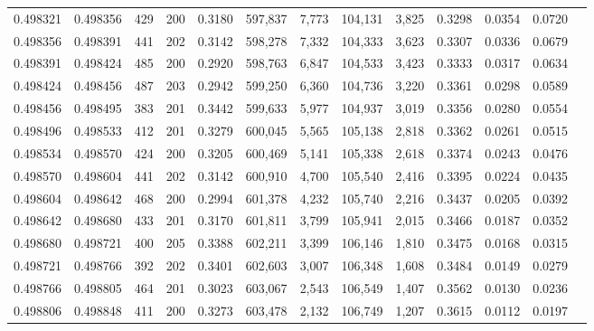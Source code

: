 \begin{tabular}{rrrrrrrrrrrrr}
0.498321 & 0.498356 &   429 & 200 &                                     0.3180 & 597,837 &   7,773 & 104,131 &   3,825 & 0.3298 & 0.0354 & 0.0720 \\
0.498356 & 0.498391 &   441 & 202 &                                     0.3142 & 598,278 &   7,332 & 104,333 &   3,623 & 0.3307 & 0.0336 & 0.0679 \\
0.498391 & 0.498424 &   485 & 200 &                                     0.2920 & 598,763 &   6,847 & 104,533 &   3,423 & 0.3333 & 0.0317 & 0.0634 \\
0.498424 & 0.498456 &   487 & 203 &                                     0.2942 & 599,250 &   6,360 & 104,736 &   3,220 & 0.3361 & 0.0298 & 0.0589 \\
0.498456 & 0.498495 &   383 & 201 &                                     0.3442 & 599,633 &   5,977 & 104,937 &   3,019 & 0.3356 & 0.0280 & 0.0554 \\
0.498496 & 0.498533 &   412 & 201 &                                     0.3279 & 600,045 &   5,565 & 105,138 &   2,818 & 0.3362 & 0.0261 & 0.0515 \\
0.498534 & 0.498570 &   424 & 200 &                                     0.3205 & 600,469 &   5,141 & 105,338 &   2,618 & 0.3374 & 0.0243 & 0.0476 \\
0.498570 & 0.498604 &   441 & 202 &                                     0.3142 & 600,910 &   4,700 & 105,540 &   2,416 & 0.3395 & 0.0224 & 0.0435 \\
0.498604 & 0.498642 &   468 & 200 &                                     0.2994 & 601,378 &   4,232 & 105,740 &   2,216 & 0.3437 & 0.0205 & 0.0392 \\
0.498642 & 0.498680 &   433 & 201 &                                     0.3170 & 601,811 &   3,799 & 105,941 &   2,015 & 0.3466 & 0.0187 & 0.0352 \\
0.498680 & 0.498721 &   400 & 205 &                                     0.3388 & 602,211 &   3,399 & 106,146 &   1,810 & 0.3475 & 0.0168 & 0.0315 \\
0.498721 & 0.498766 &   392 & 202 &                                     0.3401 & 602,603 &   3,007 & 106,348 &   1,608 & 0.3484 & 0.0149 & 0.0279 \\
0.498766 & 0.498805 &   464 & 201 &                                     0.3023 & 603,067 &   2,543 & 106,549 &   1,407 & 0.3562 & 0.0130 & 0.0236 \\
0.498806 & 0.498848 &   411 & 200 &                                     0.3273 & 603,478 &   2,132 & 106,749 &   1,207 & 0.3615 & 0.0112 & 0.0197 \\

\end{tabular}
